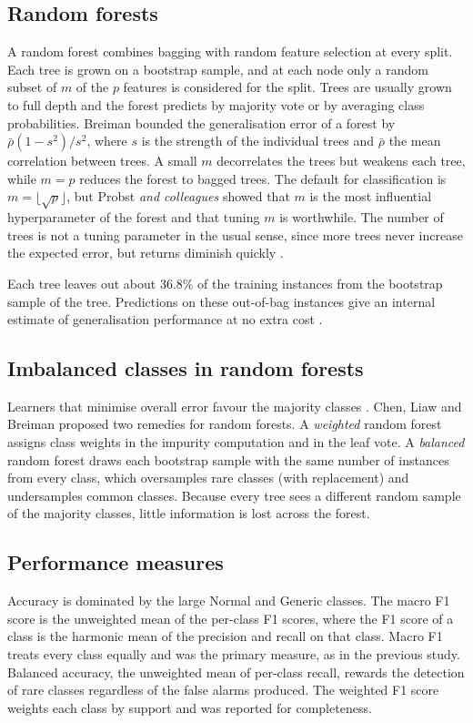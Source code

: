 \documentclass[conference,10pt]{IEEEtran}
\begin{document}
\subsection{Random forests}
A random forest \cite{breiman2001random} combines bagging with random feature selection at every split. Each tree is grown on a bootstrap sample, and at each node only a random subset of $m$ of the $p$ features is considered for the split. Trees are usually grown to full depth and the forest predicts by majority vote or by averaging class probabilities. Breiman \cite{breiman2001random} bounded the generalisation error of a forest by $\bar\rho(1-s^2)/s^2$, where $s$ is the strength of the individual trees and $\bar\rho$ the mean correlation between trees. A small $m$ decorrelates the trees but weakens each tree, while $m=p$ reduces the forest to bagged trees. The default for classification is $m=\lfloor\sqrt{p}\rfloor$, but Probst \emph{and colleagues} \cite{probst2019hyperparameters} showed that $m$ is the most influential hyperparameter of the forest and that tuning $m$ is worthwhile. The number of trees is not a tuning parameter in the usual sense, since more trees never increase the expected error, but returns diminish quickly \cite{probst2019hyperparameters}.

Each tree leaves out about 36.8\% of the training instances from the bootstrap sample of the tree. Predictions on these out-of-bag instances give an internal estimate of generalisation performance at no extra cost \cite{breiman2001random}.

\subsection{Imbalanced classes in random forests}
Learners that minimise overall error favour the majority classes \cite{he2009learning}. Chen, Liaw and Breiman \cite{chen2004using} proposed two remedies for random forests. A \emph{weighted} random forest assigns class weights in the impurity computation and in the leaf vote. A \emph{balanced} random forest draws each bootstrap sample with the same number of instances from every class, which oversamples rare classes (with replacement) and undersamples common classes. Because every tree sees a different random sample of the majority classes, little information is lost across the forest.

\subsection{Performance measures}
Accuracy is dominated by the large Normal and Generic classes. The macro F1 score is the unweighted mean of the per-class F1 scores, where the F1 score of a class is the harmonic mean of the precision and recall on that class. Macro F1 treats every class equally and was the primary measure, as in the previous study. Balanced accuracy, the unweighted mean of per-class recall, rewards the detection of rare classes regardless of the false alarms produced. The weighted F1 score weights each class by support and was reported for completeness.
\end{document}
